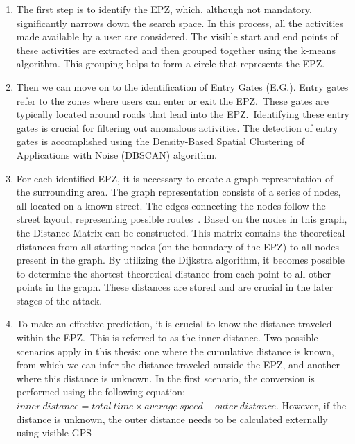 \documentclass[conference]{IEEEtran}
\begin{document}
\begin{enumerate}
    \item The first step is to identify the EPZ, which, although not mandatory,
          significantly narrows down the search space. In this process, all the
          activities made available by a user are considered. The visible start and end
          points of these activities are extracted and then grouped together using the
          k-means algorithm. This grouping helps to form a circle that represents the
          EPZ.\
    \item Then we can move on to the identification of Entry Gates (E.G.). Entry gates
          refer to the zones where users can enter or exit the EPZ.\ These gates are
          typically located around roads that lead into the EPZ.\ Identifying these entry
          gates is crucial for filtering out anomalous activities. The detection of entry
          gates is accomplished using the Density-Based Spatial Clustering of
          Applications with Noise (DBSCAN) algorithm.
    \item For each identified EPZ, it is necessary to create a graph representation of
          the surrounding area. The graph representation consists of a series of nodes,
          all located on a known street. The edges connecting the nodes follow the street
          layout, representing possible routes~\cite{neira2022graph}. Based on the nodes
          in this graph, the Distance Matrix can be constructed. This matrix contains the
          theoretical distances from all starting nodes (on the boundary of the EPZ) to
          all nodes present in the graph. By utilizing the Dijkstra algorithm, it becomes
          possible to determine the shortest theoretical distance from each point to all
          other points in the graph. These distances are stored and are crucial in the
          later stages of the attack.
    \item To make an effective prediction, it is crucial to know the distance traveled
          within the EPZ.\ This is referred to as the inner distance. Two possible
          scenarios apply in this thesis: one where the cumulative distance is known,
          from which we can infer the distance traveled outside the EPZ, and another
          where this distance is unknown. In the first scenario, the conversion is
          performed using the following equation: $inner\ distance = total\ time \times
              average\ speed - outer\ distance \label{eq:inner}$. However, if the distance is
          unknown, the outer distance needs to be calculated externally using visible GPS

\end{enumerate}
\end{document}
